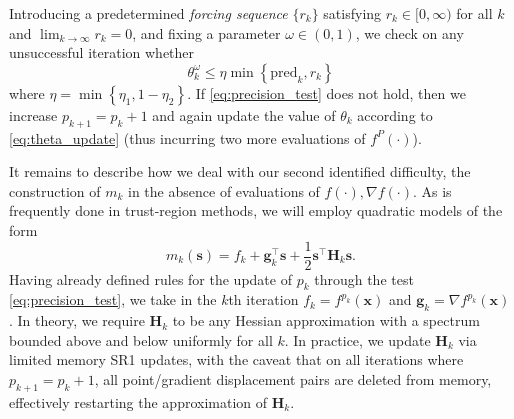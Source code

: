 \documentclass{article}
\newcommand{\xb}{\mathbf{x}}
\newcommand{\sbb}{\mathbf{s}}
\newcommand{\gb}{\mathbf{g}}
\newcommand{\Hb}{\mathbf{H}}
\newcommand{\pred}{\mathrm{pred}}
\begin{document}
Introducing a predetermined \emph{forcing sequence} $\{r_k\}$ satisfying $r_k\in[0,\infty)$ for all $k$ and $\displaystyle\lim_{k\to\infty} r_k=0$,
and fixing a parameter $\omega\in(0,1)$, 
we check on any unsuccessful iteration whether
\begin{equation}
 \label{eq:precision_test}
 \theta_k^\omega \leq \eta\min\left\{\pred_k,r_k\right\}
\end{equation}
where $\eta=\min\left\{\eta_1,1-\eta_2\right\}$. 
If \eqref{eq:precision_test} does not hold, then we increase $p_{k+1}=p_k+1$ and again 
update the value of $\theta_k$ according to \eqref{eq:theta_update} (thus incurring two more evaluations of $f^P(\cdot)$). 

It remains to describe how we deal with our second identified difficulty, 
the construction of $m_k$ in the absence of evaluations of $f(\cdot), \nabla f(\cdot)$.
As is frequently done in trust-region methods, we will employ quadratic models of the form 
\begin{equation}
 \label{eq:quad_model}
 m_k(\sbb) = f_k + \gb_k^\top\sbb + \frac{1}{2}\sbb^\top\Hb_k \sbb.
\end{equation}
Having already defined rules for the update of $p_k$ through the test \eqref{eq:precision_test}, 
we take in the $k$th iteration
$f_k = f^{p_k}(\xb)$ and
$\gb_k = \nabla f^{p_k}(\xb)$.
In theory, we require $\Hb_k$ to be any Hessian approximation with a spectrum bounded above and below uniformly for all $k$.
In practice, we update $\Hb_k$ via limited memory SR1 updates, with the caveat that on all iterations where
$p_{k+1}=p_k+1$, 
all point/gradient displacement pairs are deleted from memory, effectively restarting the approximation of $\Hb_k$. 
\end{document}
